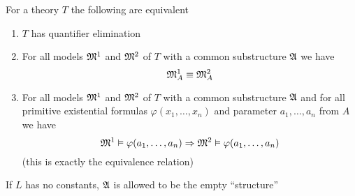 \documentclass[11pt]{article}
\begin{document}
\begin{theorem}[]
\label{thm3.2.5}
For a theory \(T\) the following are equivalent
\begin{enumerate}
\item \(T\) has quantifier elimination
\item For all models \(\mathfrak{M}^1\) and \(\mathfrak{M}^2\) of \(T\) with a common substructure
\(\mathfrak{A}\) we have
\begin{equation*}
\mathfrak{M}_A^1\equiv\mathfrak{M}_A^2
\end{equation*}
\item For all models \(\mathfrak{M}^1\) and \(\mathfrak{M}^2\) of \(T\) with a common substructure
\(\mathfrak{A}\) and for all primitive existential formulas \(\varphi(x_1,\dots,x_n)\)
and parameter \(a_1,\dots,a_n\) from \(A\) we have
\begin{equation*}
\mathfrak{M}^1\vDash\varphi(a_1,\dots,a_n)\Rightarrow\mathfrak{M}^2\vDash\varphi(a_1,\dots,a_n)
\end{equation*}
(this is exactly the equivalence relation)
\end{enumerate}

If \(L\) has no constants, \(\mathfrak{A}\) is allowed to be the empty ``structure''
\end{theorem}
\end{document}
